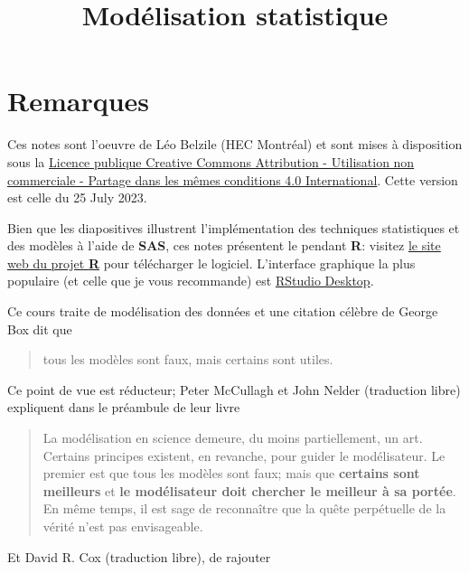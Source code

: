 \documentclass[
  11pt,
  letterpaper,
]{article}
\title{Modélisation statistique}
\author{}
\date{\vspace{-2.5em}}
\let\oldhref\href
\renewcommand{\href}[2]{#2\footnote{\url{#1}}}
\theoremstyle{definition}
\theoremstyle{definition}
\theoremstyle{definition}
\theoremstyle{definition}
\theoremstyle{remark}
\begin{document}
\maketitle

\let\href\oldhref

{
\setcounter{tocdepth}{2}
\tableofcontents
}
\hypertarget{remarques}{%
\section*{Remarques}\label{remarques}}

Ces notes sont l'oeuvre de Léo Belzile (HEC Montréal) et sont mises à disposition sous la \href{https://creativecommons.org/licenses/by-nc-sa/4.0/legalcode.fr}{Licence publique Creative Commons Attribution - Utilisation non commerciale - Partage dans les mêmes conditions 4.0 International}. Cette version est celle du 25 July 2023.

Bien que les diapositives illustrent l'implémentation des techniques statistiques et des modèles à l'aide de \textbf{SAS}, ces notes présentent le pendant \textbf{R}: visitez \href{https://cran.r-project.org/}{le site web du projet \textbf{R}} pour télécharger le logiciel. L'interface graphique la plus populaire (et celle que je vous recommande) est \href{https://www.rstudio.com/products/rstudio/download/}{RStudio Desktop}.

Ce cours traite de modélisation des données et une citation célèbre de George Box dit que

\begin{quote}
tous les modèles sont faux, mais certains sont utiles.
\end{quote}

Ce point de vue est réducteur; Peter McCullagh et John Nelder (traduction libre) expliquent dans le préambule de leur livre

\begin{quote}
La modélisation en science demeure, du moins partiellement, un art. Certains principes existent, en revanche, pour guider le modélisateur. Le premier est que tous les modèles sont faux; mais que \textbf{certains sont meilleurs} et \textbf{le modélisateur doit chercher le meilleur à sa portée}. En même temps, il est sage de reconnaître que la quête perpétuelle de la vérité n'est pas envisageable.
\end{quote}

Et David R. Cox (traduction libre), de rajouter
\end{document}
